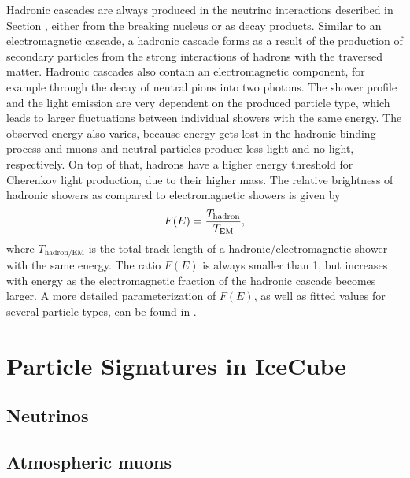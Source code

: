 Hadronic cascades are always produced in the neutrino interactions described in Section , either from the breaking nucleus or as decay products.
Similar to an electromagnetic cascade, a hadronic cascade forms as a result of the production of secondary particles from the strong interactions of hadrons with the traversed matter.
Hadronic cascades also contain an electromagnetic component, for example through the decay of neutral pions into two photons. 
The shower profile and the light emission are very dependent on the produced particle type, which leads to larger fluctuations between individual showers with the same energy.
The observed energy also varies, because energy gets lost in the hadronic binding process and muons and neutral particles produce less light and no light, respectively.
On top of that, hadrons have a higher energy threshold for Cherenkov light production, due to their higher mass.
The relative brightness of hadronic showers as compared to electromagnetic showers is given by 
\begin{equation}
    F(E) = \frac{T_\mathrm{hadron}}{T_\mathrm{EM}},%
    \labeq{relative_shower_brighness}
\end{equation}
where $T_\mathrm{hadron/EM}$ is the total track length of a hadronic/electromagnetic shower with the same energy.
The ratio $F(E)$ is always smaller than 1, but increases with energy as the electromagnetic fraction of the hadronic cascade becomes larger.
A more detailed parameterization of $F(E)$, as well as fitted values for several particle types, can be found in .


\section{Particle Signatures in IceCube} 

\subsection{Neutrinos}

\subsection{Atmospheric muons}

